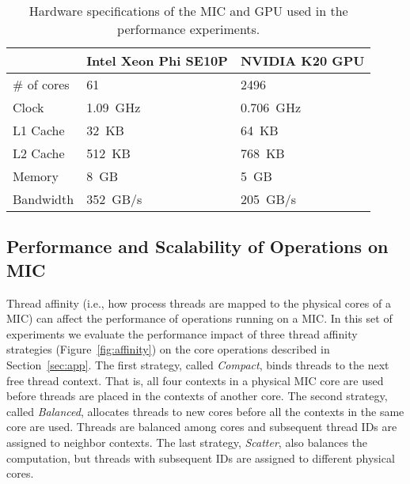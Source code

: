\begin{table}
\begin{center}
\caption{Hardware specifications of the MIC and GPU used in the performance experiments.} 
\begin{footnotesize}
\begin{tabular}{p{}p{}p{}} 
\hline
		& Intel Xeon Phi SE10P 	& NVIDIA K20 GPU  	\\ \hline \hline 
\# of cores	& 61 	 		& 2496		 	\\ \hline
Clock		& 1.09~GHz		& 0.706~GHz	\\ \hline
L1 Cache	& 32~KB			& 64~KB \\ \hline
L2 Cache	& 512~KB		& 768~KB\\ \hline
Memory		& 8~GB			& 5~GB\\ \hline
Bandwidth	& 352~GB/s		& 205~GB/s \\ \hline
\end{tabular}
\end{footnotesize}
\label{tab:devices}
\vspace*{-2ex}
\end{center}
\end{table}

  
\subsection{Performance and Scalability of Operations on MIC} \label{sec:opts-scalability}
Thread affinity (i.e., how process threads are mapped to the physical cores of a MIC) 
can affect the performance of operations running on a MIC. In this set of experiments 
we evaluate the performance impact of three thread affinity strategies 
(Figure~\ref{fig:affinity}) on the core operations described in Section~\ref{sec:app}. 
The first strategy, called 
{\em Compact}, binds threads to the next free thread context. That is, 
all four contexts in a physical MIC core are used before threads are placed
in the contexts of another core. The second strategy, called {\em Balanced}, 
allocates threads to new cores before all the contexts in the same core are 
used.  Threads are balanced among cores and subsequent thread IDs are assigned to
neighbor contexts. The last strategy, {\em Scatter}, also balances the computation, but
threads with subsequent IDs are assigned to different physical cores.

